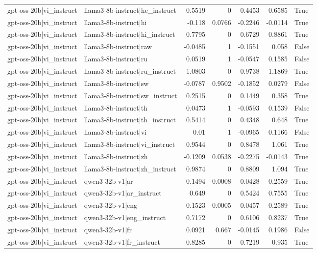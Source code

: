 \begin{table}
\begin{tabular}{l l r r r r l}
gpt-oss-20b|vi_instruct & llama3-8b-instruct|he_instruct & 0.5519 & 0 & 0.4453 & 0.6585 & True \\
gpt-oss-20b|vi_instruct & llama3-8b-instruct|hi & -0.118 & 0.0766 & -0.2246 & -0.0114 & True \\
gpt-oss-20b|vi_instruct & llama3-8b-instruct|hi_instruct & 0.7795 & 0 & 0.6729 & 0.8861 & True \\
gpt-oss-20b|vi_instruct & llama3-8b-instruct|raw & -0.0485 & 1 & -0.1551 & 0.058 & False \\
gpt-oss-20b|vi_instruct & llama3-8b-instruct|ru & 0.0519 & 1 & -0.0547 & 0.1585 & False \\
gpt-oss-20b|vi_instruct & llama3-8b-instruct|ru_instruct & 1.0803 & 0 & 0.9738 & 1.1869 & True \\
gpt-oss-20b|vi_instruct & llama3-8b-instruct|sw & -0.0787 & 0.9502 & -0.1852 & 0.0279 & False \\
gpt-oss-20b|vi_instruct & llama3-8b-instruct|sw_instruct & 0.2515 & 0 & 0.1449 & 0.358 & True \\
gpt-oss-20b|vi_instruct & llama3-8b-instruct|th & 0.0473 & 1 & -0.0593 & 0.1539 & False \\
gpt-oss-20b|vi_instruct & llama3-8b-instruct|th_instruct & 0.5414 & 0 & 0.4348 & 0.648 & True \\
gpt-oss-20b|vi_instruct & llama3-8b-instruct|vi & 0.01 & 1 & -0.0965 & 0.1166 & False \\
gpt-oss-20b|vi_instruct & llama3-8b-instruct|vi_instruct & 0.9544 & 0 & 0.8478 & 1.061 & True \\
gpt-oss-20b|vi_instruct & llama3-8b-instruct|zh & -0.1209 & 0.0538 & -0.2275 & -0.0143 & True \\
gpt-oss-20b|vi_instruct & llama3-8b-instruct|zh_instruct & 0.9874 & 0 & 0.8809 & 1.094 & True \\
gpt-oss-20b|vi_instruct & qwen3-32b-v1|ar & 0.1494 & 0.0008 & 0.0428 & 0.2559 & True \\
gpt-oss-20b|vi_instruct & qwen3-32b-v1|ar_instruct & 0.649 & 0 & 0.5424 & 0.7555 & True \\
gpt-oss-20b|vi_instruct & qwen3-32b-v1|eng & 0.1523 & 0.0005 & 0.0457 & 0.2589 & True \\
gpt-oss-20b|vi_instruct & qwen3-32b-v1|eng_instruct & 0.7172 & 0 & 0.6106 & 0.8237 & True \\
gpt-oss-20b|vi_instruct & qwen3-32b-v1|fr & 0.0921 & 0.667 & -0.0145 & 0.1986 & False \\
gpt-oss-20b|vi_instruct & qwen3-32b-v1|fr_instruct & 0.8285 & 0 & 0.7219 & 0.935 & True \\

\end{tabular}
\end{table}
